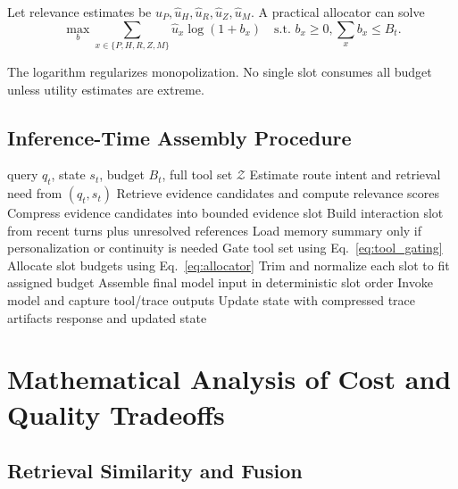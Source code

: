 \documentclass[conference]{IEEEtran}
\begin{document}
Let relevance estimates be $\hat{u}_P,\hat{u}_H,\hat{u}_R,\hat{u}_Z,\hat{u}_M$.
A practical allocator can solve
\begin{equation}
\max_{b} \sum_{x\in\{P,H,R,Z,M\}} \hat{u}_x \log(1+b_x)
\quad \text{s.t. } b_x\ge0,\sum_x b_x\le B_t.
\label{eq:allocator}
\end{equation}

The logarithm regularizes monopolization.
No single slot consumes all budget unless utility estimates are extreme.

\subsection{Inference-Time Assembly Procedure}

\begin{algorithm}[H]
\caption{Adaptive Context Assembly with MCP-Aware Tool Gating}
\label{alg:adaptive_context}
\begin{algorithmic}[1]
\Require query $q_t$, state $s_t$, budget $B_t$, full tool set $\mathcal{Z}$
\State Estimate route intent and retrieval need from $(q_t,s_t)$
\State Retrieve evidence candidates and compute relevance scores
\State Compress evidence candidates into bounded evidence slot
\State Build interaction slot from recent turns plus unresolved references
\State Load memory summary only if personalization or continuity is needed
\State Gate tool set using Eq.~\ref{eq:tool_gating}
\State Allocate slot budgets using Eq.~\ref{eq:allocator}
\State Trim and normalize each slot to fit assigned budget
\State Assemble final model input in deterministic slot order
\State Invoke model and capture tool/trace outputs
\State Update state with compressed trace artifacts
\State \Return response and updated state
\end{algorithmic}
\end{algorithm}

\section{Mathematical Analysis of Cost and Quality Tradeoffs}
\label{sec:math}

\subsection{Retrieval Similarity and Fusion}
\end{document}
